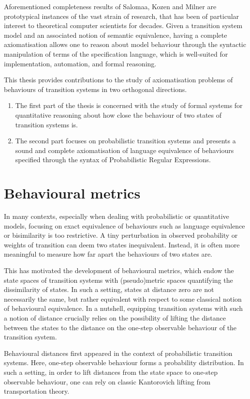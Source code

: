 Aforementioned completeness results of Salomaa, Kozen and Milner are prototypical instances of the vast strain of research, that has been of particular interest to theoretical computer scientists for decades. Given a transition system model and an associated notion of semantic equivalence, having a complete axiomatisation allows one to reason about model behaviour through the syntactic manipulation of terms of the specification language, which is well-suited for implementation, automation, and formal reasoning. 


This thesis provides contributions to the study of axiomatisation problems of behaviours of transition systems in two orthogonal directions.
\begin{enumerate}
	\item The first part of the thesis is concerned with the study of formal systems for quantitative reasoning about how close the behaviour of two states of transition systems is.
	\item The second part focuses on probabilistic transition systems and presents a sound and complete axiomatisation of language equivalence of behaviours specified through the syntax of Probabilistic Regular Expressions.
	\end{enumerate}	

\section{Behavioural metrics}
In many contexts, especially when dealing with probabilistic or quantitative models, focusing on exact equivalence of behaviours such as language equivalence or bisimilarity is too restrictive. A tiny perturbation in observed probability or weights of transition can deem two states inequivalent.  Instead, it is often more meaningful to measure how far apart the behaviours of two states are. 

This has motivated the development of behavioural metrics, which endow the state spaces of transition systems with (pseudo)metric spaces quantifying the dissimilarity of states. In such a setting, states at distance zero are not necessarily the same, but rather equivalent with respect to some classical notion of behavioural equivalence. In a nutshell, equipping transition systems with such a notion of distance crucially relies on the possibility of lifting the distance between the states to the distance on the one-step observable behaviour of the transition system.

Behavioural distances first appeared in the context of probabilistic transition systems. Here, one-step observable behaviour forms a probability distribution. In such a setting, in order to lift distances from the state space to one-step observable behaviour, one can rely on classic Kantorovich lifting from transportation theory. 

